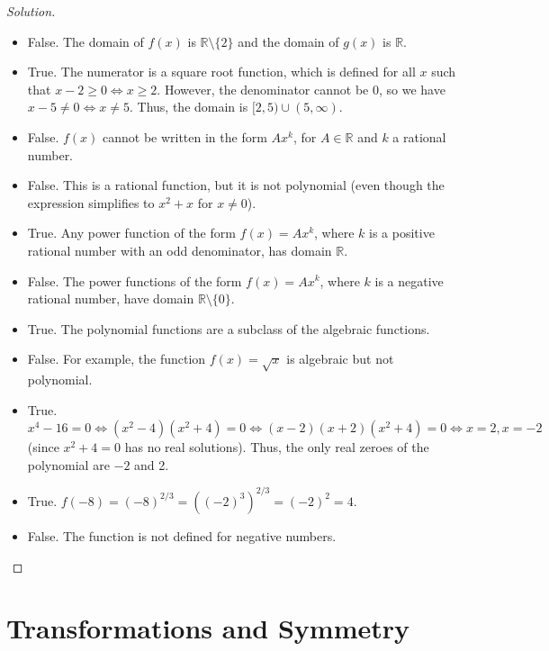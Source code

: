 \documentclass[12pt]{article}
\newenvironment{solution}{\begin{proof}[Solution]}{\end{proof}}
\begin{document}
	\begin{solution}
		\begin{itemize}
			\item[(a)] 	False. The domain of $f(x)$ is $\mathbb{R}\setminus\{2\}$ and the domain of $g(x)$ is $\mathbb{R}$.
			\item[(b)] True. The numerator is a square root function, which is defined for all $x$ such that $x-2\geq0\iff x\geq 2$. However, the denominator cannot be 0, so we have $x-5\neq0 \iff x\neq 5$. Thus, the domain is $[2,5)\cup(5,\infty)$.
			\item[(c)] False. $f(x)$ cannot be written in the form $Ax^k$, for $A\in\mathbb{R}$ and $k$ a rational number.
			\item[(d)] False. This is a rational function, but it is not polynomial (even though the expression simplifies to $x^2+x$ for $x\neq0$).
			\item[(e)] True. Any power function of the form $f(x)=Ax^k$, where $k$ is a positive rational number with an odd denominator, has domain $\mathbb{R}$.
			\item[(f)] False. The power functions of the form $f(x)=Ax^k$, where $k$ is a negative rational number, have domain $\mathbb{R}\setminus\{0\}$.
			\item[(g)] True. The polynomial functions are a subclass of the algebraic functions.
			\item[(h)]	False. For example, the function $f(x)=\sqrt{x}$ is algebraic but not polynomial.
			\item[(i)] True. $x^4-16=0\iff (x^2-4)(x^2+4)=0\iff (x-2)(x+2)(x^2+4)=0\iff x=2,x=-2$ (since $x^2+4=0$ has no real solutions). Thus, the only real zeroes of the polynomial are $-2$ and 2.
			\item[(j)] True. $f(-8)=(-8)^{2/3}=((-2)^3)^{2/3}=(-2)^2=4$.
			\item[(k)] False. The function is not defined for negative numbers.
			
		\end{itemize}
	\end{solution}
	
	
	\newpage
		\section{Transformations and Symmetry}
	
\end{document}
